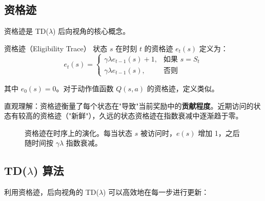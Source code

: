 \subsection{资格迹}

资格迹是 TD($\lambda$) 后向视角的核心概念。

\begin{mydefinition}{资格迹（Eligibility Trace）}
状态 $s$ 在时刻 $t$ 的资格迹 $e_t(s)$ 定义为：
$$e_t(s) = \begin{cases}
\gamma \lambda e_{t-1}(s) + 1, & \text{如果 } s = S_t \\
\gamma \lambda e_{t-1}(s), & \text{否则}
\end{cases}$$

其中 $e_0(s) = 0$。对于动作值函数 $Q(s,a)$ 的资格迹，定义类似。
\end{mydefinition}

直观理解：资格迹衡量了每个状态在"导致"当前奖励中的\textbf{贡献程度}。近期访问的状态有较高的资格迹（"新鲜"），久远的状态资格迹在指数衰减中逐渐趋于零。

\begin{figure}[H]
\centering
{}
\caption{资格迹在时序上的演化。每当状态 $s$ 被访问时，$e(s)$ 增加 1，之后随时间按 $\gamma\lambda$ 指数衰减。}
\label{fig:eligibility-trace}
\end{figure}

\subsection{TD($\lambda$) 算法}

利用资格迹，后向视角的 TD($\lambda$) 可以高效地在每一步进行更新：

